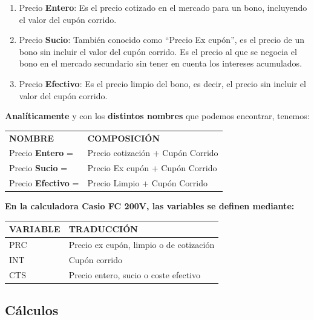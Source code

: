 \documentclass[
  letterpaper,
  DIV=11,
  numbers=noendperiod]{scrartcl}
\begin{document}
\begin{enumerate}
\def\labelenumi{\arabic{enumi}.}
\item
  Precio \textbf{Entero}: Es el precio cotizado en el mercado para un
  bono, incluyendo el valor del cupón corrido.
\item
  Precio \textbf{Sucio}: También conocido como ``Precio Ex cupón'', es
  el precio de un bono sin incluir el valor del cupón corrido. Es el
  precio al que se negocia el bono en el mercado secundario sin tener en
  cuenta los intereses acumulados.
\item
  Precio \textbf{Efectivo}: Es el precio limpio del bono, es decir, el
  precio sin incluir el valor del cupón corrido.
\end{enumerate}

\textbf{Analíticamente} y con los \textbf{distintos nombres} que podemos
encontrar, tenemos:

\begin{longtable}[]{@{}ll@{}}
\toprule\noalign{}
\endhead
\bottomrule\noalign{}
\endlastfoot
\textbf{NOMBRE} & \textbf{COMPOSICIÓN} \\
Precio \textbf{Entero} = & Precio cotización + Cupón Corrido \\
Precio \textbf{Sucio} = & Precio Ex cupón + Cupón Corrido \\
Precio \textbf{Efectivo} = & Precio Limpio + Cupón Corrido \\
\end{longtable}

\textbf{En la calculadora Casio FC 200V, las variables se definen
mediante:}

\begin{longtable}[]{@{}ll@{}}
\toprule\noalign{}
\textbf{VARIABLE} & \textbf{TRADUCCIÓN} \\
\midrule\noalign{}
\endhead
\bottomrule\noalign{}
\endlastfoot
PRC & Precio ex cupón, limpio o de cotización \\
INT & Cupón corrido \\
CTS & Precio entero, sucio o coste efectivo \\
\end{longtable}

\hypertarget{cuxe1lculos-1}{%
\subsection{Cálculos}\label{cuxe1lculos-1}}
\end{document}
